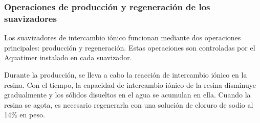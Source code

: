 
\subsubsection{Operaciones de producción y regeneración de los suavizadores}

Los suavizadores de intercambio iónico funcionan mediante dos operaciones principales: producción y regeneración. Estas operaciones son controladas por el Aquatimer instalado en cada suavizador.

Durante la producción, se lleva a cabo la reacción de intercambio iónico en la resina. Con el tiempo, la capacidad de intercambio iónico de la resina disminuye gradualmente y los sólidos disueltos en el agua se acumulan en ella. Cuando la resina se agota, es necesario regenerarla con una solución de cloruro de sodio al 14\% en peso.
